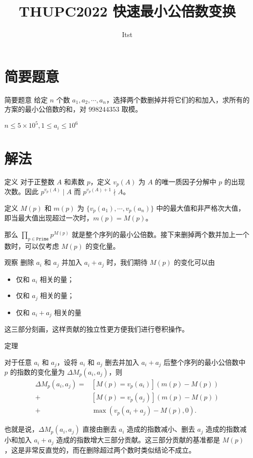 \documentclass{beamer}
\title{THUPC2022 快速最小公倍数变换}
\author{Itst}
\institute{THU\ IIIS}
\begin{document}
\begin{frame}
\titlepage
\end{frame}
\section{简要题意}
\begin{frame}{简要题意}
	给定 $n$ 个数 $a_1,a_2,\cdots,a_n$，选择两个数删掉并将它们的和加入，求所有的方案的最小公倍数的和，对 $998244353$ 取模。

	$n \le 5 \times 10^5, 1 \le a_i \le 10^6$
\end{frame}
\section{解法}
\begin{frame}{定义}
	对于正整数 $A$ 和素数 $p$，定义 $v_p(A)$ 为 $A$ 的唯一质因子分解中 $p$ 的出现次数。因此 $p^{v_p(A)} \mid A$ 而 $p^{v_p(A)+1} \nmid A$。

	定义 $M(p)$ 和 $m(p)$ 为 $\{v_p(a_1),\cdots,v_p(a_n)\}$ 中的最大值和非严格次大值，即当最大值出现超过一次时，$m(p) = M(p)$。\pause

	那么 $\prod_{p \in \texttt{Prime}} p^{M(p)}$ 就是整个序列的最小公倍数。接下来删掉两个数并加上一个数时，可以仅考虑 $M(p)$ 的变化量。
\end{frame}
\begin{frame}{观察}
	删除 $a_i$ 和 $a_j$ 并加入 $a_i+a_j$ 时，我们期待 $M(p)$ 的变化可以由 \begin{itemize}
		\item 仅和 $a_i$ 相关的量；
		\item 仅和 $a_j$ 相关的量；
		\item 仅和 $a_i+a_j$ 相关的量
	\end{itemize}
	这三部分刻画，这样贡献的独立性更方便我们进行卷积操作。
\end{frame}
\begin{frame}{定理}
	\begin{theorem}
		对于任意 $a_i$ 和 $a_j$，设将 $a_i$ 和 $a_j$ 删去并加入 $a_i+a_j$ 后整个序列的最小公倍数中 $p$ 的指数的变化量为 $\Delta M_p(a_i,a_j)$，则 \begin{align*}
			\Delta M_p(a_i,a_j) = & [M(p) = v_p(a_i)](m(p) - M(p)) \\
			 + & [M(p) = v_p(a_j)](m(p) - M(p)) \\ 
			 + & \max(v_p(a_i+a_j) - M(p) , 0).
		\end{align*}
	\end{theorem}\pause
	也就是说，$\Delta M_p(a_i,a_j)$ 直接由删去 $a_i$ 造成的指数减小、删去 $a_j$ 造成的指数减小和加入 $a_i+a_j$ 造成的指数增大三部分贡献。这三部分贡献的基准都是 $M(p)$，这是非常反直觉的，而在删除超过两个数时类似结论不成立。
\end{frame}
\end{document}
